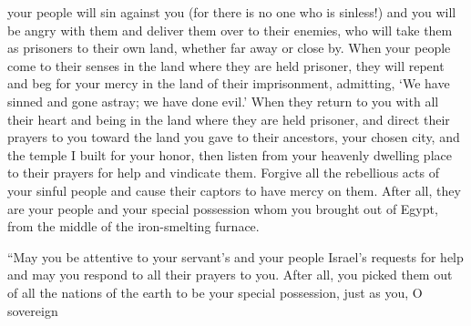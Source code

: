 {your people will sin
against you (for
there is no
one
who
is sinless!) and you will be angry
with them and deliver
them over
to their enemies,
who will take
them as prisoners
to
their own land,
whether far away
or
close by.
When your people
come to
their senses
in the land
where
they are held prisoner,
they will repent
and beg for your mercy
in the land
of their imprisonment,
admitting,
‘We have sinned
and gone astray; we have
done evil.’
When they return
to
you with all
their heart
and being
in the land
where
they are held
prisoner,
and direct
their prayers to
you toward
the land
you gave
to their ancestors,
your chosen
city,
and the temple
I built
for your honor,
then listen
from your heavenly
dwelling
place
to their prayers
for help
and vindicate them.
Forgive
all
the rebellious
acts of your sinful
people
and cause
their captors
to have mercy on them.
After
all, they are
your people
and your special
possession
whom
you brought out
of Egypt,
from the middle
of the iron-smelting
furnace.
\par }{\PP {}“May you be
attentive
to
your servant’s
and
your people
Israel’s
requests for help
and may you respond
to
all
their prayers
to you.
After
all, you
picked
them out
of all
the nations
of the earth
to be your special possession,
just as
you, O sovereign

}
